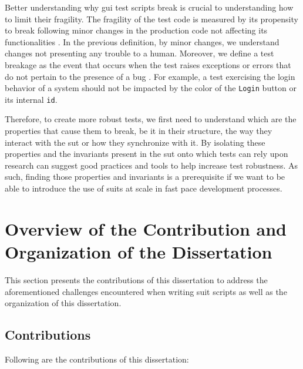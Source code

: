 Better understanding why \gls{gui} test scripts break is crucial to understanding how to limit their fragility. The fragility of the test code is measured by its propensity to break following minor changes in the production code not affecting its functionalities \cite{Garousi2016, Coppola2019}. In the previous definition, by minor changes, we understand changes not presenting any trouble to a human. Moreover, we define a test breakage as the event that occurs when the test raises exceptions or errors that do not pertain to the presence of a bug \cite{Stocco2018}. For example, a test exercising the login behavior of a system should not be impacted by the color of the \texttt{Login} button or its internal \texttt{id}. 

Therefore, to create more robust tests, we first need to understand which are the properties that cause them to break, be it in their structure, the way they interact with the \gls{sut} or how they synchronize with it. By isolating these properties and the invariants present in the \gls{sut} onto which tests can rely upon research can suggest good practices and tools to help increase test robustness. As such, finding those properties and invariants is a prerequisite if we want to be able to introduce the use of \gls{suit}s at scale in fast pace development processes.

\section{Overview of the Contribution and Organization of the Dissertation}

This section presents the contributions of this dissertation to address the aforementioned challenges encountered when writing \gls{suit} scripts as well as the organization of this dissertation. 

\subsection{Contributions}

Following are the contributions of this dissertation:

